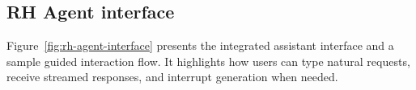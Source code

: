                                                                                                                                 \Needspace{0.72\textheight}
                                                                                                                                \subsection{RH Agent interface}
                                                                                                                                Figure~\ref{fig:rh-agent-interface} presents the integrated assistant interface and a sample guided interaction flow. It highlights how users can type natural requests, receive streamed responses, and interrupt generation when needed.

